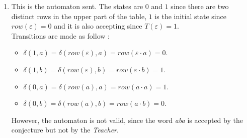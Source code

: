 \begin{enumerate}
  \item \begin{minipage}{0.3\textwidth}
          
        \end{minipage}\quad
        \begin{minipage}{0.6\textwidth}
          This is the automaton sent.
          The states are $0$ and $1$ since there are two distinct rows in the upper part of the table, $1$ is the initial state since $row(\varepsilon) = 0$ and it is also accepting since $T(\varepsilon) = 1$.\\
          Transitions are made as follow : \\
          \begin{itemize}
            \item $\delta(1, a) = \delta(row(\varepsilon), a) = row(\varepsilon \cdot a) = 0$.
            \item $\delta(1, b) = \delta(row(\varepsilon), b) = row(\varepsilon \cdot b) =  1$.
            \item $\delta(0, a) = \delta(row(a), a) = row(a \cdot a) =  1$.
            \item $\delta(0, b) = \delta(row(a), b) = row(a \cdot b) = 0$.
          \end{itemize}
          However, the automaton is not valid, since the word \textit{aba} is accepted by the conjecture but not by the \textit{Teacher}.
        \end{minipage}


\end{enumerate}
